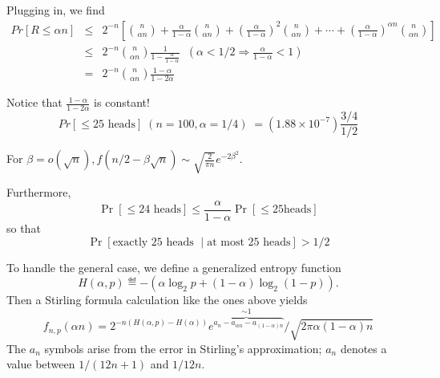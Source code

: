\documentclass[11pt,twoside]{article}
\begin{document}
Plugging in, we find
\begin{eqnarray*}
Pr[R\leq \alpha n]
  &\leq& 2^{-n}\left[ \binom{n}{\alpha n} +
  \frac{\alpha}{1-\alpha}\binom{n}{\alpha n} +
  \left(\frac{\alpha}{1-\alpha}\right)^2\binom{n}{\alpha n}+ \cdots
    + \left(\frac{\alpha}{1-\alpha}\right)^{\alpha n}\binom{n}{\alpha
      n} \right] \\
    &\leq& 2^{-n}\binom{n}{\alpha n}\frac{1}{1-\frac{\alpha}{1-\alpha}}
    \;\; (\alpha < 1/2 \Rightarrow \frac{\alpha}{1-\alpha}<1) \\
    &=& 2^{-n}\binom{n}{\alpha n}\frac{1-\alpha}{1-2\alpha}
\end{eqnarray*}

Notice that $\frac{1-\alpha}{1-2\alpha}$ is constant!
$$ Pr[\leq 25\mbox{ heads}] \; (n=100, \alpha=1/4) \; = (1.88\times
10^{-7})\frac{3/4}{1/2}  $$

For $\beta = o(\sqrt{n}), f(n/2-\beta\sqrt{n}) \sim \sqrt{\frac{2}{\pi
    n}}e^{-2\beta^2}$.

Furthermore,
\[
\Pr[\le 24\mbox{ heads}] \le \frac{\alpha}{1-\alpha}\Pr[\le 25\mbox{
  heads}]
\]
so that
\[
\Pr[\mbox{exactly $25$ heads } \mid \mbox{at most $25$ heads}] > 1/2
\]
\fi

To handle the general case, we define a generalized entropy function
\[
H(\alpha,p) \eqdef - (\alpha \log_2 p + (1 - \alpha) \log_2 (1 - p)).
\]
Then a Stirling formula calculation like the ones above yields
\begin{equation}\label{biased alpha term}
f_{n,p}(\alpha n) = 2^{-n(H(\alpha,p) - H(\alpha))}\overbrace{e^{a_n -
a_{\alpha n} - a_{(1-\alpha) n}}}^{\sim 1}/\sqrt{2 \pi \alpha (1 - \alpha) n}
\end{equation}
The $a_n$ symbols arise from the error in Stirling's approximation; $a_n$
denotes a value between $1/(12n+1)$ and $1/12n$.
\end{document}
